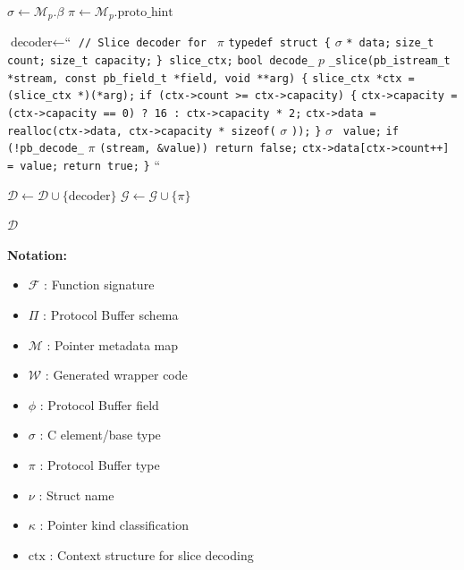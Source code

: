 \begin{algorithm}[H]
\begin{algorithmic}[1]
        \STATE $\sigma \leftarrow \mathcal{M}_p.\beta$ 
        \STATE $\pi \leftarrow \mathcal{M}_p.\text{proto\_hint}$ 

            \STATE $\text{decoder} \leftarrow \text{``}$
            \STATE \quad \texttt{// Slice decoder for } $\pi$
            \STATE \quad \texttt{typedef struct \{}
            \STATE \quad \quad $\sigma$ \texttt{* data;}
            \STATE \quad \quad \texttt{size\_t count;}
            \STATE \quad \quad \texttt{size\_t capacity;}
            \STATE \quad \texttt{\} slice\_ctx;}
            \STATE \quad
            \STATE \quad \texttt{bool decode\_} $p$ \texttt{\_slice(pb\_istream\_t *stream, const pb\_field\_t *field, void **arg) \{}
            \STATE \quad \quad \texttt{slice\_ctx *ctx = (slice\_ctx *)(*arg);}
            \STATE \quad \quad \texttt{if (ctx->count >= ctx->capacity) \{}
            \STATE \quad \quad \quad \texttt{ctx->capacity = (ctx->capacity == 0) ? 16 : ctx->capacity * 2;}
            \STATE \quad \quad \quad \texttt{ctx->data = realloc(ctx->data, ctx->capacity * sizeof(} $\sigma$ \texttt{));}
            \STATE \quad \quad \texttt{\}}
            \STATE \quad \quad $\sigma$ \texttt{ value;}
            \STATE \quad \quad \texttt{if (!pb\_decode\_} $\pi$ \texttt{(stream, \&value)) return false;}
            \STATE \quad \quad \texttt{ctx->data[ctx->count++] = value;}
            \STATE \quad \quad \texttt{return true;}
            \STATE \quad \texttt{\}}
            \STATE $\text{``}$

            \STATE $\mathcal{D} \leftarrow \mathcal{D} \cup \{\text{decoder}\}$
            \STATE $\mathcal{G} \leftarrow \mathcal{G} \cup \{\pi\}$
        \ENDIF
    \ENDFOR

    \RETURN $\mathcal{D}$
\ENDPROCEDURE

\end{algorithmic}
\end{algorithm}

\vspace{0.5cm}

\textbf{Notation:}
\begin{itemize}
    \item $\mathcal{F}$ : Function signature
    \item $\Pi$ : Protocol Buffer schema
    \item $\mathcal{M}$ : Pointer metadata map
    \item $\mathcal{W}$ : Generated wrapper code
    \item $\phi$ : Protocol Buffer field
    \item $\sigma$ : C element/base type
    \item $\pi$ : Protocol Buffer type
    \item $\nu$ : Struct name
    \item $\kappa$ : Pointer kind classification
    \item $\text{ctx}$ : Context structure for slice decoding
\end{itemize}

